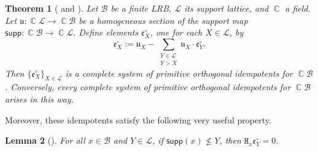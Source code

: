 \documentclass[11pt, oneside, reqno]{amsart}
\newtheorem{theorem}{Theorem}[section]
\newtheorem{lemma}[theorem]{Lemma}
\theoremstyle{definition}
\numberwithin{equation}{section}
\DeclareMathOperator{\C}{\mathbb{C}}
\def \BB{{\mathcal{B}}}
\def \kk{\C}
\def \lat{{\mathcal{L}}}
\def \uu{{\mathfrak{u}}}
\def \ee{{\mathfrak{e}}}
\def \supp{\mathsf{supp}}
\newcommand{\B}[1]{\mathtt{#1}} 			%
\begin{document}
\begin{theorem}[{\cite[Theorem~4.2]{saliola07quiverLRB} and \cite[Prop. 11.9]{am17}}] \label{thm:CSoPOIforLRB}
    Let $\BB$ be a finite LRB, $\lat$ its support lattice, and $\kk$ a field.
    Let $\uu: \kk\lat \xrightarrow{} \kk\BB$ be a homogeneous section of the support map
    $\supp: \kk\BB \to \kk\lat$.
    Define elements $\ee^\circ_X$, one for each $X \in \lat$, by
    \begin{equation}\label{eq:saliolarecursion}
    \ee^{\circ}_{X}:= \uu_{X} - \sum_{\substack{Y \in \lat \\ Y > X}} \uu_{X}\cdot \ee^{\circ}_{Y}. \end{equation}
    Then $\{ \ee^\circ_X \}_{X \in \lat}$ is a complete system of primitive orthogonal idempotents for $\kk \BB$.
    Conversely, every complete system of primitive orthogonal idempotents for $\kk\BB$ arises in this way.
\end{theorem}

Moreover, these idempotents satisfy the following very useful property.

\begin{lemma}[{\citep[Lemma 5.1]{saliola2009face}}]
    \label{lem:Saliola's}
    For all $x \in \BB$ and $Y \in \lat$, if $\supp(x) \not\leq Y$, then $\B{H}_x \ee^\circ_Y = 0$.
\end{lemma}
\end{document}
